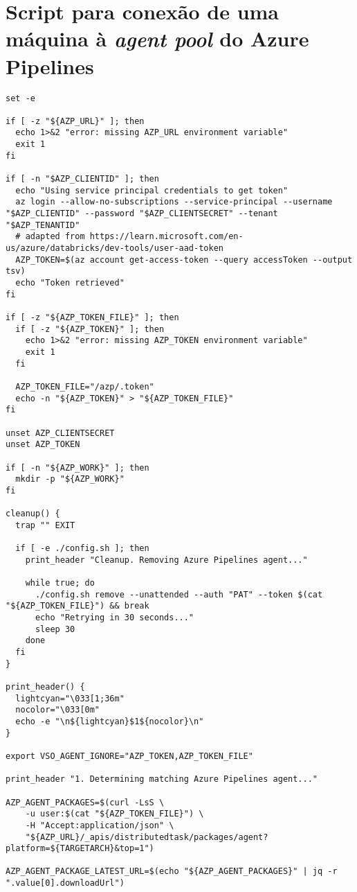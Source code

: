 \chapter{Script para conexão de uma máquina à \textit{agent pool} do Azure Pipelines}
\label{app:pipeline-start.sh}

\begin{Verbatim}[breaklines=true, fontsize=\small]
set -e

if [ -z "${AZP_URL}" ]; then
  echo 1>&2 "error: missing AZP_URL environment variable"
  exit 1
fi

if [ -n "$AZP_CLIENTID" ]; then
  echo "Using service principal credentials to get token"
  az login --allow-no-subscriptions --service-principal --username "$AZP_CLIENTID" --password "$AZP_CLIENTSECRET" --tenant "$AZP_TENANTID"
  # adapted from https://learn.microsoft.com/en-us/azure/databricks/dev-tools/user-aad-token
  AZP_TOKEN=$(az account get-access-token --query accessToken --output tsv)
  echo "Token retrieved"
fi

if [ -z "${AZP_TOKEN_FILE}" ]; then
  if [ -z "${AZP_TOKEN}" ]; then
    echo 1>&2 "error: missing AZP_TOKEN environment variable"
    exit 1
  fi

  AZP_TOKEN_FILE="/azp/.token"
  echo -n "${AZP_TOKEN}" > "${AZP_TOKEN_FILE}"
fi

unset AZP_CLIENTSECRET
unset AZP_TOKEN

if [ -n "${AZP_WORK}" ]; then
  mkdir -p "${AZP_WORK}"
fi

cleanup() {
  trap "" EXIT

  if [ -e ./config.sh ]; then
    print_header "Cleanup. Removing Azure Pipelines agent..."

    while true; do
      ./config.sh remove --unattended --auth "PAT" --token $(cat "${AZP_TOKEN_FILE}") && break
      echo "Retrying in 30 seconds..."
      sleep 30
    done
  fi
}

print_header() {
  lightcyan="\033[1;36m"
  nocolor="\033[0m"
  echo -e "\n${lightcyan}$1${nocolor}\n"
}

export VSO_AGENT_IGNORE="AZP_TOKEN,AZP_TOKEN_FILE"

print_header "1. Determining matching Azure Pipelines agent..."

AZP_AGENT_PACKAGES=$(curl -LsS \
    -u user:$(cat "${AZP_TOKEN_FILE}") \
    -H "Accept:application/json" \
    "${AZP_URL}/_apis/distributedtask/packages/agent?platform=${TARGETARCH}&top=1")

AZP_AGENT_PACKAGE_LATEST_URL=$(echo "${AZP_AGENT_PACKAGES}" | jq -r ".value[0].downloadUrl")


\end{Verbatim}
